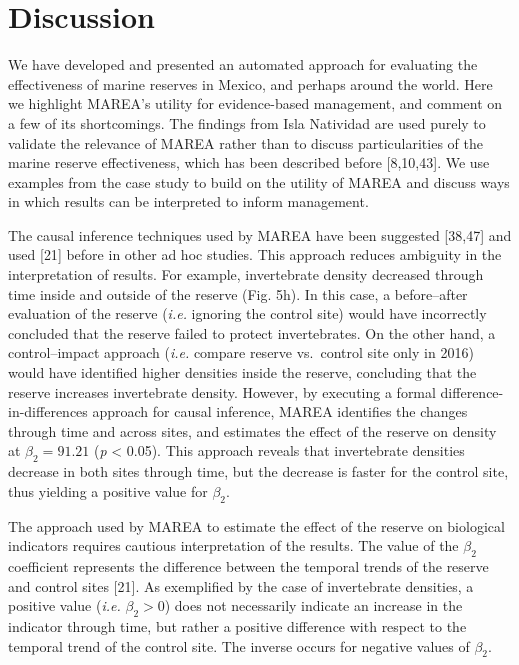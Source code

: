 \documentclass[12pt,]{article}
\begin{document}
\clearpage

\section{Discussion}\label{discussion}

We have developed and presented an automated approach for evaluating the
effectiveness of marine reserves in Mexico, and perhaps around the
world. Here we highlight MAREA's utility for evidence-based management,
and comment on a few of its shortcomings. The findings from Isla
Natividad are used purely to validate the relevance of MAREA rather than
to discuss particularities of the marine reserve effectiveness, which
has been described before {[}8,10,43{]}. We use examples from the case
study to build on the utility of MAREA and discuss ways in which results
can be interpreted to inform management.

The causal inference techniques used by MAREA have been suggested
{[}38,47{]} and used {[}21{]} before in other ad hoc studies. This
approach reduces ambiguity in the interpretation of results. For
example, invertebrate density decreased through time inside and outside
of the reserve (Fig. 5h). In this case, a before--after evaluation of
the reserve (\emph{i.e.} ignoring the control site) would have
incorrectly concluded that the reserve failed to protect invertebrates.
On the other hand, a control--impact approach (\emph{i.e.} compare
reserve vs.~control site only in 2016) would have identified higher
densities inside the reserve, concluding that the reserve increases
invertebrate density. However, by executing a formal
difference-in-differences approach for causal inference, MAREA
identifies the changes through time and across sites, and estimates the
effect of the reserve on density at \(\beta_2 = 91.21\) (\emph{p}
\textless{} 0.05). This approach reveals that invertebrate densities
decrease in both sites through time, but the decrease is faster for the
control site, thus yielding a positive value for \(\beta_2\).

The approach used by MAREA to estimate the effect of the reserve on
biological indicators requires cautious interpretation of the results.
The value of the \(\beta_2\) coefficient represents the difference
between the temporal trends of the reserve and control sites {[}21{]}.
As exemplified by the case of invertebrate densities, a positive value
(\emph{i.e.} \(\beta_2 > 0\)) does not necessarily indicate an increase
in the indicator through time, but rather a positive difference with
respect to the temporal trend of the control site. The inverse occurs
for negative values of \(\beta_2\).
\end{document}

